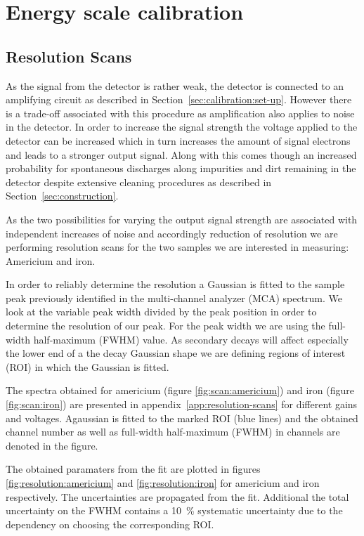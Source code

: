 \section{Energy scale calibration}

\subsection{Resolution Scans}
\label{sec:resolution_scans}
As the signal from the detector is rather weak, the detector is connected to an
amplifying circuit as described in Section~\ref{sec:calibration:set-up}. However
there is a trade-off associated with this procedure as amplification also
applies to noise in the detector. In order to increase the signal strength the
voltage applied to the detector can be increased which in turn increases the
amount of signal electrons and leads to a stronger output signal. Along with
this comes though an increased probability for spontaneous discharges along
impurities and dirt remaining in the detector despite extensive cleaning
procedures as described in Section~\ref{sec:construction}.

As the two possibilities for varying the output signal strength are associated
with independent increases of noise and accordingly reduction of resolution we
are performing resolution scans for the two samples we are interested in
measuring: Americium and iron.

In order to reliably determine the resolution a Gaussian is fitted to the sample
peak previously identified in the multi-channel analyzer (MCA) spectrum. We look
at the variable peak width divided by the peak position in order to determine
the resolution of our peak. For the peak width we are using the full-width
half-maximum (FWHM) value. As secondary decays will affect especially the lower
end of a the decay Gaussian  shape we are defining regions of interest (ROI) in which the Gaussian
is fitted.

The spectra obtained for americium (figure \ref{fig:scan:americium}) and iron
(figure \ref{fig:scan:iron}) are presented in appendix~\ref{app:resolution-scans} for different gains and voltages.
Agaussian is fitted to the marked ROI (blue lines) and the obtained channel number as well as
full-width half-maximum (FWHM) in channels are denoted in the figure.

The obtained paramaters from the fit are plotted in figures
\ref{fig:resolution:americium} and \ref{fig:resolution:iron} for americium and
iron respectively. The uncertainties are propagated from the fit. Additional the
total uncertainty on the FWHM contains a \SI{10}{\percent} systematic
uncertainty due to the dependency on choosing the corresponding ROI.

